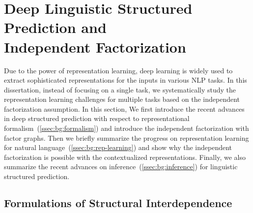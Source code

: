 \section[Deep Linguistic Structured Prediction and Independent
Factorization]{Deep Linguistic Structured Prediction and \\Independent
  Factorization}
\label{sec:background:deepsp}

Due to the power of representation learning, deep learning is widely
used to extract sophisticated representations for the inputs in
various NLP tasks. In this dissertation, instead of focusing on a single
task, we systematically study the representation learning challenges
for multiple tasks based on the independent factorization
assumption. In this section, We first introduce the recent advances
in deep structured prediction with respect to representational
formalism~(\autoref{ssec:bg:formalism}) and introduce the independent
factorization with factor graphs. Then we briefly summarize the
progress on representation learning for natural
language~(\autoref{ssec:bg:rep-learning}) and show why the independent
factorization is possible with the contextualized representations.
Finally, we also summarize the recent advances on
inference~(\autoref{ssec:bg:inference}) for linguistic structured prediction.


\subsection{Formulations of Structural Interdependence}
\label{ssec:bg:formalism}

